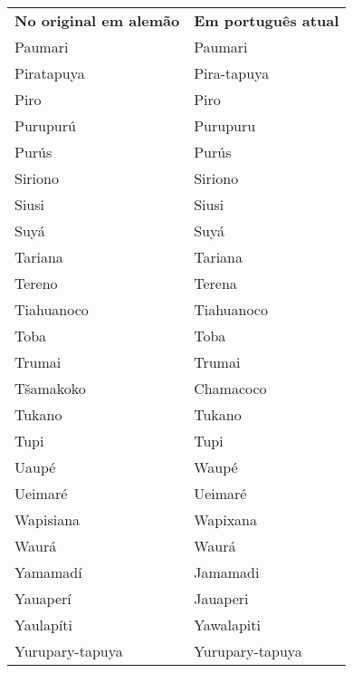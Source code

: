 \begin{table}[ht!]
\begin{center}
\begin{tabular}{ll}
\textbf{No original em alemão} & \textbf{Em português atual} \\
Paumari & Paumari \\ 
Piratapuya & Pira-tapuya \\ 
Piro & Piro \\ 
Purupurú & Purupuru \\ 
Purús & Purús \\ 
Siriono & Siriono \\ 
Siusi & Siusi \\ 
Suyá & Suyá \\ 
Tariana & Tariana \\ 
Tereno & Terena \\ 
Tiahuanoco & Tiahuanoco \\ 
Toba & Toba \\ 
Trumai & Trumai \\ 
Tšamakoko & Chamacoco \\ 
Tukano & Tukano \\ 
Tupi & Tupi \\ 
Uaupé & Waupé \\ 
Ueimaré & Ueimaré \\ 
Wapisiana & Wapixana \\ 
Waurá & Waurá \\ 
Yamamadí & Jamamadi \\ 
Yauaperí & Jauaperi \\ 
Yaulapíti & Yawalapiti \\ 
Yurupary-tapuya & Yurupary-tapuya \\ 
\end{tabular}
\end{center}
\end{table}